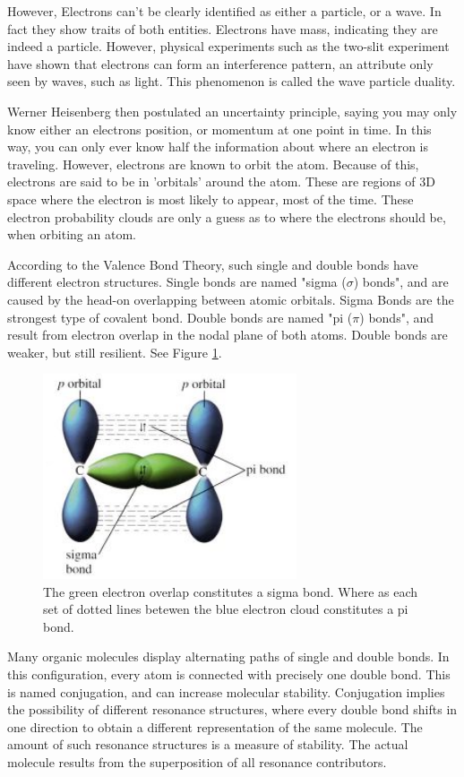 \documentclass[12pt]{article}
\begin{document}
However, Electrons can't be clearly identified as either a particle, or a wave. In fact they show traits of both entities. Electrons have mass, indicating they are indeed a particle. However, physical experiments such as the two-slit experiment have shown that electrons can form an interference pattern, an attribute only seen by waves, such as light. This phenomenon is called the wave particle duality. 

Werner Heisenberg then postulated an uncertainty principle, saying you may only know either an electrons position, or momentum at one point in time. In this way, you can only ever know half the information about where an electron is traveling. However, electrons are known to orbit the atom. Because of this, electrons are said to be in 'orbitals' around the atom. These are regions of 3D space where the electron is most likely to appear, most of the time. These electron probability clouds are only a guess as to where the electrons should be, when orbiting an atom.
 
According to the Valence Bond Theory, such single and double bonds have different electron structures. Single bonds are named "sigma ($\sigma$) bonds", and are caused by the head-on overlapping between atomic orbitals. Sigma Bonds are the strongest type of covalent bond. Double bonds are named "pi ($\pi$) bonds", and result from electron overlap in the nodal plane of both atoms. Double bonds are weaker, but still resilient. See Figure \ref{fig:bonds}.

\begin{figure}[ht!]
\centering
\includegraphics[width=75mm]{bonds.png}
\caption{The green electron overlap constitutes a sigma bond. Where as each set of dotted lines betewen the blue electron cloud constitutes a pi bond.}
\label{fig:bonds}
\end{figure}

Many organic molecules display alternating paths of single and double bonds. In this configuration, every atom is connected with precisely one double bond. This is named conjugation, and can increase molecular stability. Conjugation implies the possibility of different resonance structures, where every double bond shifts in one direction to obtain a different representation of the same molecule. The amount of such resonance structures is a measure of stability. The actual molecule results from the superposition of all resonance contributors.
\end{document}
